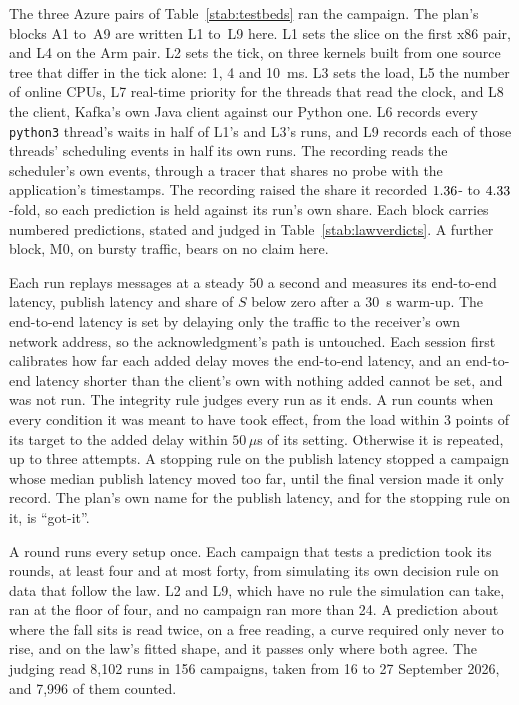\documentclass[10pt,journal,onecolumn]{IEEEtran}
\newcommand{\kafka}{Kafka}
\begin{document}
The three Azure pairs of Table~\ref{stab:testbeds} ran the campaign. The plan's blocks A1 to~A9
are written L1 to~L9 here. L1 sets the slice on the first
x86 pair, and L4 on the Arm pair. L2 sets the tick, on three kernels built from one source tree
that differ in the tick alone: 1, 4 and 10~ms. L3 sets the load, L5 the number of online CPUs, L7
real-time priority for the threads that read the clock, and L8 the client, \kafka{}'s own Java
client against our Python one. L6 records every \texttt{python3} thread's waits in half of L1's and
L3's runs, and L9 records each of those threads' scheduling events in half its own runs. The recording reads the scheduler's own events, through a tracer that shares no probe with the application's timestamps. The recording raised the share it recorded $1.36$- to $4.33$-fold, so each prediction is held against its run's own share. Each block
carries numbered predictions, stated and judged in Table~\ref{stab:lawverdicts}. A further block,
M0, on bursty traffic, bears on no claim here.

Each run replays messages at a steady 50 a second and measures its end-to-end latency, publish
latency and share of $S$ below zero after a 30~s warm-up. The end-to-end latency is set by delaying only
the traffic to the receiver's own network address, so the acknowledgment's path is untouched. Each
session first calibrates how far each added delay moves the end-to-end latency, and an end-to-end
latency shorter than the client's own with nothing added cannot be set, and was not run. The
integrity rule judges every run as it ends. A run counts when every condition it was meant to have
took effect, from the load within 3 points of its target to the added delay within $50\,\mu$s of its
setting. Otherwise it is repeated, up to three attempts. A stopping rule on the publish latency
stopped a campaign whose median publish latency moved too far, until the final version made it
only record. The plan's own name for the publish latency, and for the stopping rule on it, is
``got-it''.

A round runs every setup once. Each campaign that tests a prediction took its rounds, at least four
and at most forty, from simulating its own decision rule on data that follow the law. L2 and L9,
which have no rule the simulation can take, ran at the floor of four, and no campaign ran more than
24. A prediction about where the fall sits is read twice, on a free reading, a curve required only
never to rise, and on the law's fitted shape, and it passes only where both agree. The judging read
8,102 runs in 156 campaigns, taken from 16 to 27 September 2026, and 7,996 of them counted.
\end{document}
